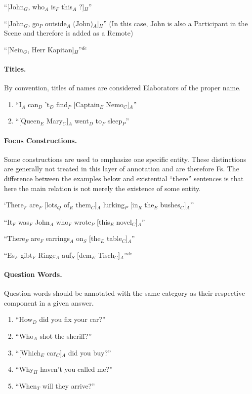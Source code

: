 \documentclass[11pt]{article}
\newcommand{\be}{\begin{enumerate}}
\newcommand{\ee}{\end{enumerate}}
\newcommand{\german}[1]{{\color{red}#1$^{de}$}}
\newcommand{\dd}[1]{{\color{blue}{#1}}}
\begin{document}
\be 
\item
``[John$_G$, who$_A$ is$_F$ this$_A$ ?]$_H$''
\item  ``[John$_G$, go$_P$ outside$_A$ (John)$_A$]$_H$'' (In this case, John is also a Participant in the Scene and therefore is added as a Remote)
\german{\item
``[Nein$_G$, Herr Kapitan]$_H$''}
\ee

\paragraph{Titles.} By convention, titles of names are considered Elaborators of the proper name.

\be 
\item
``I$_A$ can$_D$ 't$_D$ find$_P$ [Captain$_E$ Nemo$_C$]$_A$''
\item
``[Queen$_E$ Mary$_C$]$_A$ went$_D$ to$_F$ sleep$_P$''
\ee

\paragraph{Focus Constructions.} Some constructions are used to emphasize one specific entity. These distinctions are generally not treated in this layer of annotation and are therefore Fs.
The difference between the examples below and existential ``there'' sentences is that here the main relation is not merely
the existence of some entity.
\be
\item
 `There$_F$ are$_F$ [lots$_Q$ of$_R$ them$_C$]$_A$ lurking$_P$ [in$_R$ the$_E$ bushes$_C$]$_A$''
\item
``It$_F$ was$_F$  John$_A$ who$_F$ wrote$_P$ [this$_E$ novel$_C$]$_A$''

\item
``There$_F$ are$_F$ earrings$_A$ on$_S$ [the$_E$ table$_C$]$_A$''
\german{
\item
``Es$_F$ gibt$_F$ Ringe$_A$ auf$_S$ [dem$_E$ Tisch$_C$]$_A$''}
\ee

\paragraph{Question Words.} Question words should be annotated with the same category as their respective component in a given answer. 

\be \item
``How$_D$ did you fix your car?''
\item
``Who$_A$ shot the sheriff?''
\item
``[Which$_E$ car$_C$]$_A$ did you buy?''
\item
``Why$_H$ haven't you called me?''
\item
``When$_T$ will they arrive?''
\ee
\end{document}
